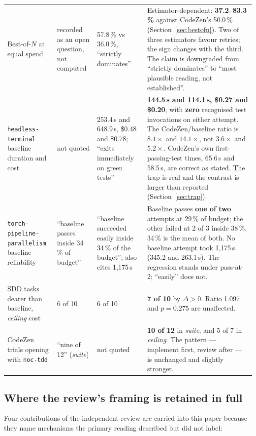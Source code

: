 \documentclass[11pt,a4paper]{article}
\newcommand{\code}[1]{\texttt{\small #1}}
\newcommand{\task}[1]{\texttt{\footnotesize #1}}
\begin{document}
\begin{table}[htbp]
\begin{tabular}{@{}p{3.5cm}p{3.3cm}p{3.3cm}p{4.6cm}@{}}
\addlinespace
Best-of-$N$ at equal spend &
recorded as an open question, not computed &
57.8\,\% vs 36.0\,\%, ``strictly dominates'' &
Estimator-dependent: \textbf{37.2--83.3\,\%} against CodeZen's 50.0\,\%
(Section~\ref{sec:bestofn}). Two of three estimators favour retries; the sign changes with
the third. The claim is downgraded from ``strictly dominates'' to ``most plausible reading,
not established''. \\
\addlinespace
\task{headless-terminal} baseline
duration and cost &
not quoted &
253.4\,s and 648.9\,s, \$0.48 and \$0.78; ``exits immediately on green tests'' &
\textbf{144.5\,s and 114.1\,s, \$0.27 and \$0.20}, with \textbf{zero} recognised test
invocations on either attempt. The CodeZen/baseline ratio is $8.1\times$ and $14.1\times$, not
$3.6\times$ and $5.2\times$. CodeZen's own first-passing-test times, 65.6\,s and 58.5\,s, are
correct as stated. The trap is real and the contrast is larger than reported
(Section~\ref{sec:trap}). \\
\addlinespace
\task{torch-pipeline-}\newline\task{parallelism} baseline
reliability &
``baseline passes inside 34\,\% of budget'' &
``baseline succeeded easily inside 34\,\% of the budget''; also cites 1{,}175\,s &
Baseline passes \textbf{one of two} attempts at 29\,\% of budget; the other failed at 2 of 3
inside 38\,\%. 34\,\% is the mean of both. No baseline attempt took 1{,}175\,s (345.2 and
263.1\,s). The regression stands under pass-at-2; ``easily'' does not. \\
\addlinespace
SDD tasks dearer than baseline, \emph{ceiling} cost &
6 of 10 &
6 of 10 &
\textbf{7 of 10} by $\Delta > 0$. Ratio 1.097 and $p = 0.275$ are unaffected. \\
\addlinespace
CodeZen trials opening with
\code{noc-tdd} &
``nine of 12'' (\emph{suite}) &
not quoted &
\textbf{10 of 12} in \emph{suite}, and 5 of 7 in \emph{ceiling}. The pattern --- implement
first, review after --- is unchanged and slightly stronger. \\
\bottomrule
\end{tabular}
\end{table}

\subsection{Where the review's framing is retained in full}

Four contributions of the independent review are carried into this paper because they name
mechanisms the primary reading described but did not label:
\end{document}
